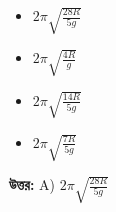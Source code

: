 \documentclass[12pt, a4paper]{article}
\begin{document}
\begin{itemize}[label={}, leftmargin=1cm, itemsep=0.5em]
\item[\textbf{A)}] $2\pi \sqrt{\frac{28R}{5g}}$
\item[\textbf{B)}] $2\pi \sqrt{\frac{4R}{g}}$
\item[\textbf{C)}] $2\pi \sqrt{\frac{14R}{5g}}$
\item[\textbf{D)}] $2\pi \sqrt{\frac{7R}{5g}}$
\end{itemize}
\vspace{0.5em}

\begin{tcolorbox}[answerbox]
\textbf{\color{success} উত্তর:} A) $2\pi \sqrt{\frac{28R}{5g}}$
\end{tcolorbox}
\end{document}
